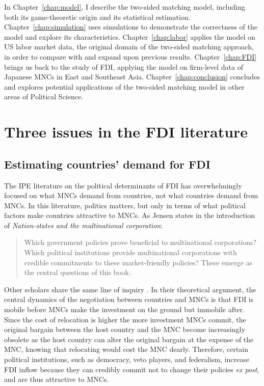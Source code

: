 In Chapter~\ref{chap:model}, I describe the two-sided matching model, including
both its game-theoretic origin and its statistical estimation.
Chapter~\ref{chap:simulation} uses simulations to demonstrate the correctness of
the model and explore its characteristics. Chapter~\ref{chap:labor} applies the
model on US labor market data, the original domain of the two-sided matching
approach, in order to compare with and expand upon previous results.
Chapter~\ref{chap:FDI} brings us back to the study of FDI, applying the model on
firm-level data of Japanese MNCs in East and Southeast Asia.
Chapter~\ref{chap:conclusion} concludes and explores potential applications of
the two-sided matching model in other areas of Political Science.

\section{Three issues in the FDI literature}
\label{sec:literature_issues}

\subsection{Estimating countries' demand for FDI}

The IPE literature on the political determinants of FDI has overwhelmingly
focused on what MNCs demand from countries, not what countries demand from MNCs.
In this literature, politics matters, but only in terms of what
political factors make countries attractive to MNCs. As Jensen states in
the introduction of \textit{Nation-states and the multinational corporation}:

\begin{quote}
  Which government policies prove beneficial to multinational corporations?
Which political institutions provide multinational corporations with credible
commitments to these market-friendly policies? These emerge as the central
questions of this book.
\end{quote}

Other scholars share the same line of inquiry \citep{Ahlquist2006, Busse2007,
  Buthe2008, Li2003}. In their theoretical argument, the central dynamics of the
negotiation between countries and MNCs is that FDI is mobile before MNCs make
the investment on the ground but immobile after. Since the cost of relocation is
higher the more investment MNCs commit, the original bargain between the host
country and the MNC become increasingly obsolete as the host country can alter
the original bargain at the expense of the MNC, knowing that relocating would
cost the MNC dearly. Therefore, certain political
institutions, such as democracy, veto players, and federalism, increase FDI
inflow because they can credibly commit not to change their policies \textit{ex
  post}, and are thus
attractive to MNCs.


